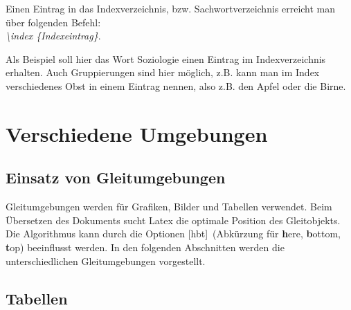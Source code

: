 Einen Eintrag in das Indexverzeichnis, bzw. Sachwortverzeichnis erreicht man über folgenden Befehl:\\
\textit{\textbackslash index \textnormal{\{Indexeintrag\}}}.

Als Beispiel soll hier das Wort Soziologie einen Eintrag im Indexverzeichnis erhalten. Auch Gruppierungen sind hier möglich, z.B. kann man im Index verschiedenes Obst in einem Eintrag nennen, also z.B. den Apfel oder die Birne.


\section{Verschiedene Umgebungen}
\label{sec:Umgebungen}

\subsection{Einsatz von Gleitumgebungen}

Gleitumgebungen werden für Grafiken, Bilder und Tabellen verwendet. Beim Übersetzen des Dokuments sucht Latex die optimale Position des Gleitobjekts. Die Algorithmus kann durch die Optionen [hbt]~(Abkürzung für \textbf{h}ere, \textbf{b}ottom, \textbf{t}op) beeinflusst werden. In den folgenden Abschnitten werden die unterschiedlichen Gleitumgebungen vorgestellt.

\subsection{Tabellen}

%
%


